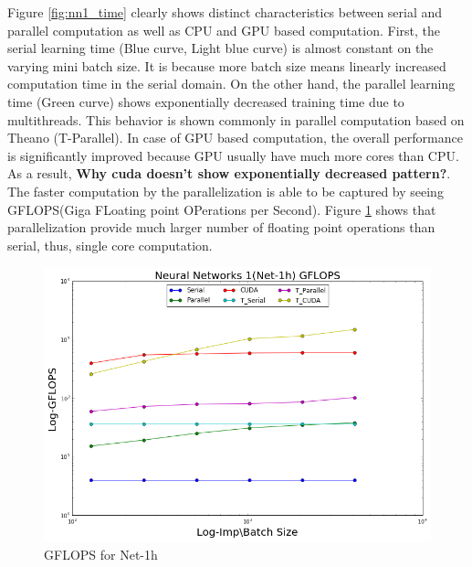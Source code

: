 Figure \ref{fig:nn1_time} clearly shows distinct characteristics between serial and parallel computation as well as CPU and GPU based computation. First, the serial learning time (Blue curve, Light blue curve) is almost constant on the varying mini batch size. It is because more batch size means linearly increased computation time in the serial domain. On the other hand, the parallel learning time (Green curve) shows exponentially decreased training time due to multithreads. This behavior is shown commonly in parallel computation based on Theano (T-Parallel). In case of GPU based computation, the overall performance is significantly improved because GPU usually have much more cores than CPU. As a result, \textbf{Why cuda doesn't show exponentially decreased pattern?}.\\
The faster computation by the parallelization is able to be captured by seeing GFLOPS(Giga FLoating point OPerations per Second). Figure \ref{fig:nn1_gflops} shows that parallelization provide much larger number of floating point operations than serial, thus, single core computation.   
\begin{figure}[ht]
\begin{center}
\centerline{\includegraphics[width=\columnwidth]{../../slide/nn1_gflops.png}}
\caption{GFLOPS for Net-1h}
\label{fig:nn1_gflops}
\end{center}
\vskip -0.4in
\end{figure}



